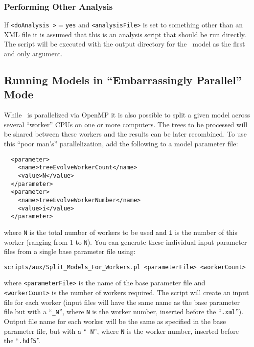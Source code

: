 \subsubsection{Performing Other Analysis}

If {\tt \textless doAnalysis \textgreater}$=${\tt yes} and {\tt \textless analysisFile\textgreater} is set to something other than an XML file it is assumed that this is an analysis script that should be run directly. The script will be executed with the output directory for the \glc\ model as the first and only argument.

\subsection{Running Models in ``Embarrassingly Parallel'' Mode}

While \glc\ is parallelized via OpenMP it is also possible to split a given model across several ``worker'' CPUs on one or more computers. The trees to be processed will be shared between these workers and the results can be later recombined. To use this ``poor man's'' parallelization, add the following to a model parameter file:
\begin{verbatim}
  <parameter>
    <name>treeEvolveWorkerCount</name>
    <value>N</value>
  </parameter>
  <parameter>
    <name>treeEvolveWorkerNumber</name>
    <value>i</value>
  </parameter>
\end{verbatim}
where {\tt N} is the total number of workers to be used and {\tt i} is the number of this worker (ranging from 1 to {\tt N}). You can generate these individual input parameter files from a single base parameter file using:
\begin{verbatim}
scripts/aux/Split_Models_For_Workers.pl <parameterFile> <workerCount>
\end{verbatim}
where {\tt <parameterFile>} is the name of the base parameter file and {\tt <workerCount>} is the number of workers required. The script will create an input file for each worker (input files will have the same name as the base parameter file but with a ``{\tt \_N}'', where {\tt N} is the worker number, inserted before the ``{\tt .xml}''). Output file name for each worker will be the same as specified in the base parameter file, but with a ``{\tt \_N}'', where {\tt N} is the worker number, inserted before the ``{\tt .hdf5}''.

